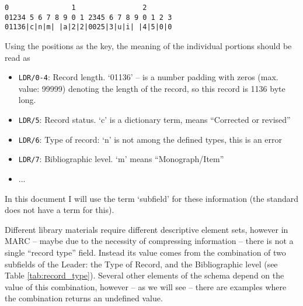 \begin{small}
\begin{Verbatim}[samepage=true]
0               1                2
01234 5 6 7 8 9 0 1 2345 6 7 8 9 0 1 2 3
01136|c|n|m| |a|2|2|0025|3|u|i| |4|5|0|0
\end{Verbatim}
\end{small}

Using the positions as the key, the meaning of the individual portions should be read as
\begin{itemize}
 \setlength{\parskip}{0pt}
 \setlength{\itemsep}{0pt plus 1pt}
 \item \texttt{LDR/0-4}: Record length. `01136’ -- is a number padding with zeros (max. value: 99999) denoting the length of the record, so this record is 1136 byte long. 
 \item \texttt{LDR/5}: Record status. `c’ is a dictionary term, means ``Corrected or revised''
 \item \texttt{LDR/6}: Type of record: `n’ is not among the defined types, this is an error
 \item \texttt{LDR/7}: Bibliographic level. `m’ means ``Monograph/Item''
 \item ...
\end{itemize}

In this document I will use the term `subfield' for these information (the standard does not have a term for this).

Different library materials require different descriptive element sets, however in MARC -- maybe due to the necessity of compressing information -- there is not a single ``record type'' field. Instead its value comes from the combination of two subfields of the Leader: the Type of Record, and the Bibliographic level (see Table \ref{tab:record_type}). Several other elements of the schema depend on the value of this combination, however -- as we will see -- there are examples where the combination returns an undefined value.

